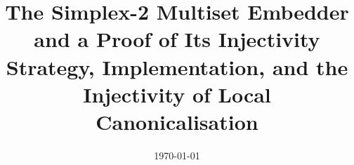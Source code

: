\documentclass[11pt,a4paper]{article}
\title{\textbf{The Simplex-2 Multiset Embedder and a Proof of Its Injectivity}\\[0.4em]
       \large Strategy, Implementation, and the Injectivity of Local Canonicalisation}
\date{\today}
\begin{document}
\maketitle
\tableofcontents
\bigskip







\appendix

\end{document}
